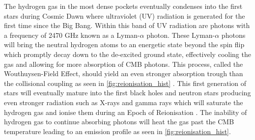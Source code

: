 The hydrogen gas in the most dense pockets eventually condenses into the first stars during Cosmic Dawn where ultraviolet (UV) radiation is generated for the first time since the Big Bang. Within this band of UV radiation are photons with a frequency of 2470 GHz known as a Lyman-$\alpha$ photon. These Lyman-$\alpha$ photons will bring the neutral hydrogen atoms to an energetic state beyond the spin flip which promptly decay down to the de-excited ground state, effectively cooling the gas and allowing for more absorption of CMB photons. This process, called the Wouthuysen-Field Effect, should yield an even stronger absorption trough than the collisional coupling as seen in \cref{fig:reionisation_hist} \citep{wouthuysen,field}. This first generation of stars will eventually mature into the first black holes and neutron stars producing even stronger radiation such as X-rays and gamma rays which will saturate the hydrogen gas and ionise them during an Epoch of Reionisation \citep{liuData}. The inability of hydrogen gas to continue absorbing photons will heat the gas past the CMB temperature leading to an emission profile as seen in \cref{fig:reionisation_hist}.

